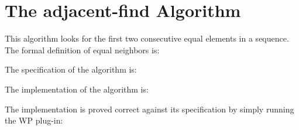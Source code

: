 \section{The \textsf{adjacent-find} Algorithm}
\label{adjacent-find}

This algorithm looks for the first two consecutive equal elements in a sequence.
The formal definition of equal neighbors is:


The specification of the algorithm is:


The implementation of the algorithm is:


The implementation is proved correct against its specification by
simply running the \textsf{WP} plug-in:


